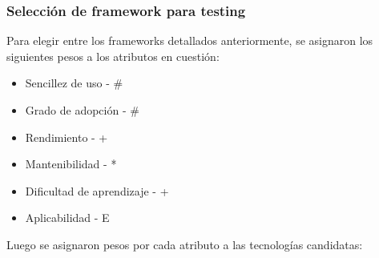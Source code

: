 \documentclass{article}
\begin{document}
\subsubsection{Selección de framework para testing}
Para elegir entre los frameworks detallados anteriormente, se asignaron los siguientes pesos a los atributos en cuestión:
\begin{itemize}
    \item Sencillez de uso - \#
    \item Grado de adopción - \#
    \item Rendimiento - +
    \item Mantenibilidad - *
    \item Dificultad de aprendizaje - +
    \item Aplicabilidad - E
\end{itemize}
Luego se asignaron pesos por cada atributo a las tecnologías candidatas:
\end{document}
